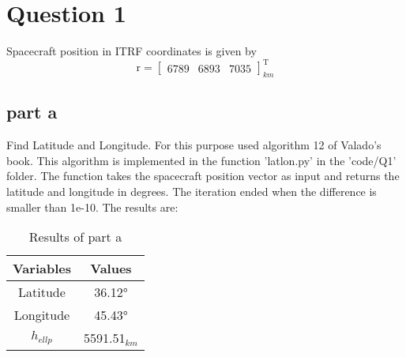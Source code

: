 \section{Question 1}

Spacecraft position in ITRF coordinates is given by
$$
\boldsymbol{\mathrm{r}} = 
\begin{bmatrix}
    6789 & 6893 & 7035
\end{bmatrix}^{\mathrm{T}}_{km}
$$

\subsection{part a}
Find Latitude and Longitude. For this purpose used algorithm 12 of Valado's book. This algorithm is implemented in the function 'latlon.py' in the 'code/Q1' folder. The function takes the spacecraft position vector as input and returns the latitude and longitude in degrees. The iteration ended when the difference is smaller than 1e-10. The results are:

\begin{table}[H]
    \caption{Results of part a}
    \begin{center}
        \begin{tabular}{|c|c|}
            \hline
            \textbf{Variables} & \textbf{Values} \\
            \hline
            Latitude & \ang{36.12} \\
            Longitude & \ang{45.43} \\
            $h_{ellp}$ & 5591.51$_{km}$ \\
            \hline
            \end{tabular}
    \end{center}
\end{table}
